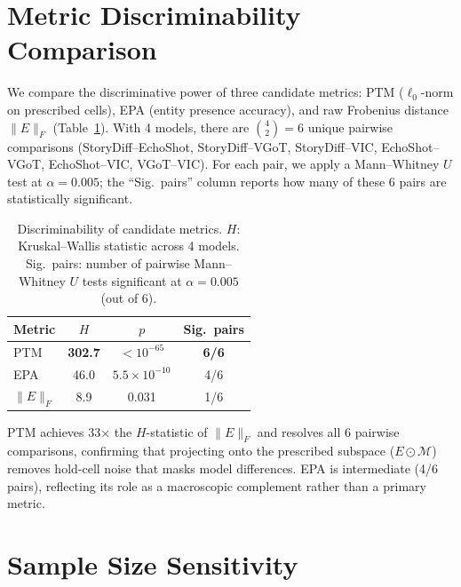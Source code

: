 \documentclass[sigconf,review,anonymous]{acmart}
\begin{document}
\section{Metric Discriminability Comparison}
\label{app:metric_discriminability}

We compare the discriminative power of three candidate metrics: PTM ($\ell_0$-norm on prescribed cells), EPA (entity presence accuracy), and raw Frobenius distance $\|E\|_F$ (Table~\ref{tab:discriminability}). With 4 models, there are $\binom{4}{2} = 6$ unique pairwise comparisons (StoryDiff--EchoShot, StoryDiff--VGoT, StoryDiff--VIC, EchoShot--VGoT, EchoShot--VIC, VGoT--VIC). For each pair, we apply a Mann--Whitney $U$ test at $\alpha = 0.005$; the ``Sig.\ pairs'' column reports how many of these 6 pairs are statistically significant.
\begin{table}[ht]
\caption{Discriminability of candidate metrics. $H$: Kruskal--Wallis statistic across 4 models. Sig.\ pairs: number of pairwise Mann--Whitney $U$ tests significant at $\alpha = 0.005$ (out of 6).}
\label{tab:discriminability}
\centering
\small
\begin{tabular}{@{}lccc@{}}
\toprule
Metric & $H$ & $p$ & Sig.\ pairs \\
\midrule
PTM              & \textbf{302.7} & $< 10^{-65}$ & \textbf{6/6} \\
EPA              & 46.0           & $5.5 \times 10^{-10}$ & 4/6 \\
$\|E\|_F$        & 8.9            & 0.031 & 1/6 \\
\bottomrule
\end{tabular}
\end{table}

PTM achieves 33$\times$ the $H$-statistic of $\|E\|_F$ and resolves all 6 pairwise comparisons, confirming that projecting onto the prescribed subspace ($E \odot \mathcal{M}$) removes hold-cell noise that masks model differences.
EPA is intermediate (4/6 pairs), reflecting its role as a macroscopic complement rather than a primary metric.


\section{Sample Size Sensitivity}
\label{app:sample_size}
\end{document}
